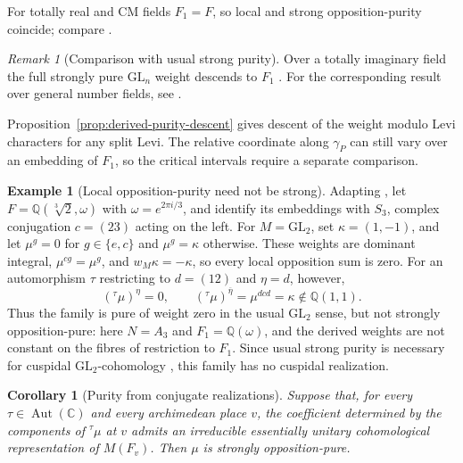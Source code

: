 \documentclass[12pt]{amsart}
\numberwithin{equation}{section}
\theoremstyle{plain}
\newtheorem{corollary}[theorem]{Corollary}
\theoremstyle{definition}
\newtheorem{example}[theorem]{Example}
\theoremstyle{remark}
\newtheorem{remark}[theorem]{Remark}
\renewcommand{\bar}{\overline}
\begin{document}
For totally real and CM fields $F_1=F$, so local and strong opposition-purity coincide; compare \cite[\S2.3.3]{Raghuram2025}. 

\begin{remark}[Comparison with usual strong purity]\label{rem:strong-purity-descent}
Over a totally imaginary field the full strongly pure $\mathrm{GL}_n$ weight descends to $F_1$ \cite[Prop.~2.6]{Raghuram2025}. For the corresponding result over general number fields, see
\cite[Prop.~3.3]{DarshanRaghuram2024}.

Proposition~\ref{prop:derived-purity-descent} gives descent of the weight modulo Levi characters for any split Levi. The relative coordinate along $\gamma_P$ can still vary over an embedding of $F_1$, so the critical intervals require a separate comparison. 
\end{remark}

\begin{example}[Local opposition-purity need not be strong] \label{ex:nonCM}
Adapting \cite[\S2.3.4]{Raghuram2025}, let $F=\mathbb Q(\sqrt[3]{2},\omega)$ with $\omega=e^{2\pi i/3}$, and identify its embeddings with $S_3$, complex conjugation $c=(23)$ acting on the left. For $M=\mathrm{GL}_2$, set $\kappa=(1,-1)$, and let $\mu^g=0$ for $g\in\{e,c\}$ and $\mu^g=\kappa$ otherwise. These weights are dominant integral, $\mu^{cg}=\mu^g$, and $w_M\kappa=-\kappa$, so every local opposition sum is zero. For an automorphism $\tau$ restricting to $d=(12)$ and $\eta=d$, however, 
\[
 ({}^{\tau}\mu)^\eta=0,\qquad
 ({}^{\tau}\mu)^{\bar\eta}=\mu^{dcd}=\kappa
 \notin\mathbb Q(1,1).
\]
Thus the family is pure of weight zero in the usual $\mathrm{GL}_2$ sense, but not strongly opposition-pure: here $N=A_3$ and $F_1=\mathbb Q(\omega)$, and the derived weights are not constant on the fibres of restriction to $F_1$. Since usual strong purity is necessary for cuspidal $\mathrm{GL}_2$-cohomology \cite[\S1.2]{BhagwatRaghuram2017}, this family has no cuspidal realization.
\end{example}

\begin{corollary}[Purity from conjugate realizations] \label{cor:realized-strong-purity}
Suppose that, for every $\tau\in\operatorname{Aut}(\mathbb C)$ and every archimedean place $v$, the coefficient determined by the components of ${}^{\tau}\mu$ at $v$ admits an irreducible essentially unitary cohomological representation of $M(F_v)$. Then $\mu$ is strongly opposition-pure. 
\end{corollary}
\end{document}
